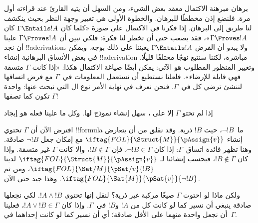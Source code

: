 \documentclass[../../../include/open-logic-section]{subfiles}
\begin{document}
      {}
      {}


برهان مبرهنة الاكتمال معقد بعض الشيء، ومن السهل أن يتيه القارئ عند
قراءته أول مرة. فلنضع إذن مخططًا للبرهان. والخطوة الأولى هي تغيير
وجهة النظر بحيث ينكشف لنا طريق إلى البرهان. إذا فكرنا في الاكتمال على
صورة «كلما كان $\Gamma \Entails !A$ كان $\Gamma \Proves !A$»، فقد
يصعب حتى أن تخطر لنا فكرة: فلكي نبين أن $\Gamma \Proves !A$ علينا أن
نجد !!a{derivation}، ولا يبدو أن الفرض $\Gamma \Entails !A$ يعيننا على
ذلك بوجه. ويمكن في بعض الأنساق البرهانية إنشاء !!a{derivation} مباشرة،
لكننا سنتبع نهجًا مختلفًا قليلًا. وتغيير المنظور المطلوب هو الآتي:
يمكن أيضًا صياغة الاكتمال هكذا: «إذا كانت $\Gamma$ متسقة فهي قابلة
للإرضاء». فلعلنا نستطيع أن نستعمل المعلومات في~$\Gamma$ مع فرض اتساقها
لننشئ  ترضي كل
 في~$\Gamma$. فنحن نعرف في نهاية
الأمر نوع ال التي نبحث عنها:
واحدة تكون كما تصفها $\Gamma$!{}

إذا لم تحتو $\Gamma$ إلا على ، سهل إنشاء نموذج لها.
 وكل ما
علينا فعله هو إيجاد

افترض الآن أن $\Gamma$ تحتوي !!{formula} ما~$\lnot !B$، حيث $!B$
ذرية. وقد نقلق من أن يتعارض إنشاء
$\iftag{FOL}{\Struct{M}}{\pAssign{v}}$ مع إمكان جعل $\lnot !B$ صادقة.
وهنا تظهر فائدة اتساق~$\Gamma$: إذا كان $\lnot !B \in \Gamma$، فإن
$!B \notin \Gamma$، وإلا كانت $\Gamma$ غير متسقة. وإذا كان
$!B \notin \Gamma$، فبحسب إنشائنا لـ
$\iftag{FOL}{\Struct{M}}{\pAssign{v}}$ لدينا
$\iftag{FOL}{\Sat/{M}}{\pSat/{v}}{!B}$، ومن ثم
$\iftag{FOL}{\Sat{M}}{\pSat{v}}{\lnot !B}$. وهذا جيد حتى الآن.

ولكن ماذا لو احتوت $\Gamma$ صيغًا مركبة غير ذرية؟ لنقل إنها تحتوي
$!A \land !B$. لكي نجعلها صادقة ينبغي أن نسير كما لو كانت كل من $!A$
و$!B$ في~$\Gamma$. وإذا كان $!A \lor !B \in \Gamma$، فعلينا أن نجعل
واحدة منهما على الأقل صادقة؛ أي أن نسير كما لو كانت إحداهما
في~$\Gamma$.
\end{document}
